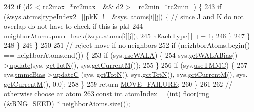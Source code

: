 \begin{DoxyCode}
242                                 \textcolor{keywordflow}{if} (d2 < rc2max\_*rc2max\_ && d2 >= rc2min\_*rc2min\_) \{
243                                     \textcolor{keywordflow}{if} (&sys.\hyperlink{classsim_system_a90421b19082f7fb8fc23b7264b1161e4}{atoms}[typeIndex2\_][pkK] != &sys.
      \hyperlink{classsim_system_a90421b19082f7fb8fc23b7264b1161e4}{atoms}[i][j]) \{ \textcolor{comment}{// since J and K do not overlap do not have to check if this is pkJ}
244                                             neighborAtoms.push\_back(&sys.\hyperlink{classsim_system_a90421b19082f7fb8fc23b7264b1161e4}{atoms}[i][j]);
245                                             nEachType[i] += 1;
246                                     \}
247                                 \}
248                         \}
249                     \}
250 
251                     \textcolor{comment}{// reject move if no neighbors}
252                     \textcolor{keywordflow}{if} (neighborAtoms.begin() == neighborAtoms.end()) \{
253                         \textcolor{keywordflow}{if} (sys.\hyperlink{classsim_system_aa83b00006b3919fb6e13f1bdeadece6a}{useWALA}) \{
254                                 sys.\hyperlink{classsim_system_a7cb5049de8b0988349e89e30e4000407}{getWALABias}()->\hyperlink{classwala_ab439e3f60bea6c54522a870b9ad67acf}{update}(sys.
      \hyperlink{classsim_system_a37dd827f4057049763351510147b9f1d}{getTotN}(), sys.\hyperlink{classsim_system_a299fe4372e610b554eaaf5f5957b2dbc}{getCurrentM}());
255                         \}
256                         \textcolor{keywordflow}{if} (sys.\hyperlink{classsim_system_aa474a50b6353c8897331b1ab1ce53ab1}{useTMMC}) \{
257                                 sys.\hyperlink{classsim_system_a13173f45a1e40a5f5a3552b0ebe15b54}{tmmcBias}->\hyperlink{classtmmc_ae067afc5b52af203b9d45f18d9737219}{updateC} (sys.
      \hyperlink{classsim_system_a37dd827f4057049763351510147b9f1d}{getTotN}(), sys.\hyperlink{classsim_system_a37dd827f4057049763351510147b9f1d}{getTotN}(), sys.\hyperlink{classsim_system_a299fe4372e610b554eaaf5f5957b2dbc}{getCurrentM}(), sys.
      \hyperlink{classsim_system_a299fe4372e610b554eaaf5f5957b2dbc}{getCurrentM}(), 0.0);
258                         \}
259                         \textcolor{keywordflow}{return} \hyperlink{moves_8h_a9832cf5fcfa8c0894545b591c9908e39}{MOVE\_FAILURE};
260                     \}
261 
262                     \textcolor{comment}{// otherwise choose an atom}
263                     \textcolor{keyword}{const} \textcolor{keywordtype}{int} atomIndex = (int) floor(\hyperlink{utilities_8cpp_a0f9542af4b475ac79cb679d7a8d14db0}{rng} (&\hyperlink{global_8h_a3f4e4ea24d5a5c66feae55d1f329c884}{RNG\_SEED}) * neighborAtoms.size());

\end{DoxyCode}
